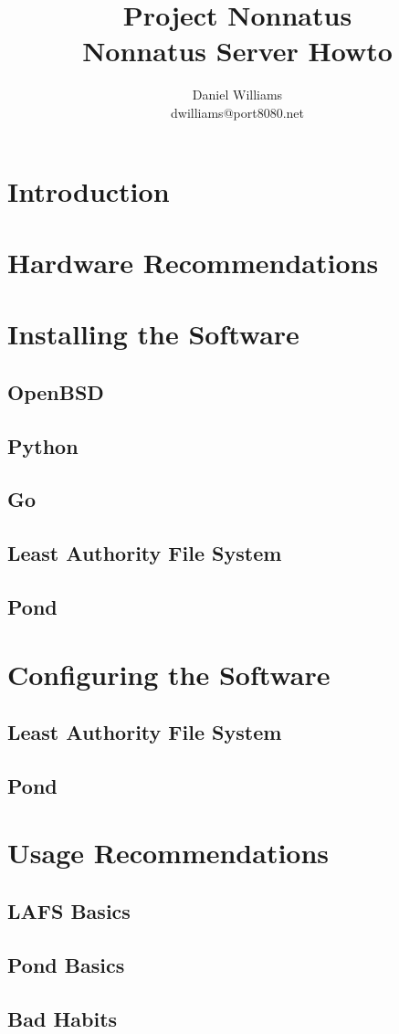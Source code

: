 \documentclass[letterpaper]{article}
\title{Project Nonnatus \\ Nonnatus Server Howto}
\author{Daniel Williams \\ dwilliams@port8080.net}
\begin{document}
\maketitle

\section{Introduction}

\section{Hardware Recommendations}

\section{Installing the Software}

\subsection{OpenBSD}

\subsection{Python}

\subsection{Go}

\subsection{Least Authority File System}

\subsection{Pond}

\section{Configuring the Software}

\subsection{Least Authority File System}

\subsection{Pond}

\section{Usage Recommendations}

\subsection{LAFS Basics}

\subsection{Pond Basics}

\subsection{Bad Habits}
\end{document}
